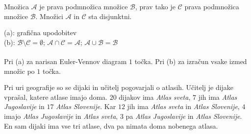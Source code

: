 \documentclass[addpoints,11pt]{exam}
\begin{document}
\begin{questions}
     \newpage
    \question
    Množica $\mathcal{A}$ je prava podmnožica množice $\mathcal{B}$, prav tako je $\mathcal{C}$ prava podmnožica množice $\mathcal{B}$. Množici $\mathcal{A}$ in $\mathcal{C}$ sta disjunktni.

    \begin{solution}[11cm]
        (a): grafična upodobitev \\
        (b): $\mathcal{B}\setminus\mathcal{C}=\emptyset$; $\mathcal{A}\cap\mathcal{C}=\mathcal{A}$; $\mathcal{A}\cup\mathcal{B}=\mathcal{B}$ \\ \\
        Pri (a) za narisan Euler-Vennov diagram $1$ točka. Pri (b) za izračun vsake izmed množic po $1$ točka.
    \end{solution}





    \newpage

    
    \question
    Pri uri geografije so se dijaki in učitelj pogovarjali o atlasih.  Učitelj je dijake vprašal, katere atlase imajo doma.
    $20$ dijakov ima \textit{Atlas sveta}, $7$ jih ima \textit{Atlas Jugoslavije} in $17$ \textit{Atlas Slovenije}. Kar $12$ jih ima \textit{Atlas sveta} in \textit{Atlas Slovenije}, $4$ imajo \textit{Atlas Jugoslavije} in \textit{Atlas sveta},
    $3$ pa \textit{Atlas Jugoslavije} in \textit{Atlas Slovenije}. En sam dijaki ima vse tri atlase, dva pa nimata doma nobenega atlasa. 
\end{questions}
\end{document}
